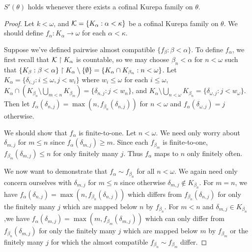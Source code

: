 \documentclass[11pt]{article}
\begin{document}
  \begin{theorem}
    \(S'(\theta)\) holds whenever there exists a cofinal Kurepa family on \(\theta\).
  \end{theorem}

  \begin{proof}
    Let \(k<\omega\), and \(\mathcal{K}=\{K_\alpha:\alpha<\kappa\}\)
    be a cofinal Kurepa family on \(\theta\).
    We should define \(f_\alpha:K_\alpha\to\omega\) for each \(\alpha<\kappa\).

    Suppose we've defined pairwise almost compatible
    \(\{f_\beta:\beta<\alpha\}\). To define
    \(f_\alpha\), we first recall that \(\mathcal{K}\restriction K_\alpha\) is countable,
    so we may choose \(\beta_n<\alpha\) for \(n<\omega\) such that
    \(
      \{K_\beta:\beta<\alpha\}\restriction K_\alpha \setminus \{\emptyset\}
        =
      \{K_\alpha\cap K_{\beta_n}:n<\omega\}
    \).
    Let \(K_\alpha=\{\delta_{i,j}:i\leq\omega,j<w_i\}\) where
    \(w_i\leq\omega\) for each \(i\leq\omega\),
    \(
      K_\alpha\cap \left(K_{\beta_n}\setminus\bigcup_{m<n}K_{\beta_m}\right)
        =
      \{\delta_{n,j}:j<w_n\}
    \),
    and
    \(
      K_\alpha\setminus\bigcup_{n<\omega}K_{\beta_n}
        =
      \{
        \delta_{\omega,j}:j<w_\omega
      \}
    \).
    Then let \(f_\alpha(\delta_{n,j})=\max(n,f_{\beta_n}(\delta_{n,j}))\) for
    \(n<\omega\) and \(f_\alpha(\delta_{\omega,j})=j\) otherwise.

    We should show that \(f_\alpha\) is finite-to-one. Let \(n<\omega\).
    We need only worry about \(\delta_{m,j}\) for \(m\leq n\) since
    \(f_\alpha(\delta_{m,j})\geq m\). Since each
    \(f_{\beta_m}\) is finite-to-one, \(f_{\beta_m}(\delta_{m,j})\leq n\)
    for only finitely many \(j\). Thus \(f_\alpha\) maps to
    \(n\) only finitely often.

    We now want to demonstrate that \(f_\alpha\sim f_{\beta_n}\) for all
    \(n<\omega\). We again need only concern ourselves with \(\delta_{m,j}\) for
    \(m\leq n\) since otherwise \(\delta_{m,j}\not\in K_{\beta_n}\).
    For \(m=n\), we have
    \(f_\alpha(\delta_{n,j})=\max(n,f_{\beta_n}(\delta_{n,j}))\) which differs
    from \(f_{\beta_n}(\delta_{n,j})\) for only the finitely many \(j\) which
    are mapped below \(n\) by \(f_{\beta_n}\).
    For \(m<n\) and \(\delta_{m,j}\in K_{\beta_n}\),we have
    \(f_\alpha(\delta_{m,j})=\max(m,f_{\beta_m}(\delta_{m,j}))\) which can
    only differ
    from \(f_{\beta_n}(\delta_{m,j})\) for only the finitely many \(j\) which
    are mapped below \(m\) by \(f_{\beta_m}\) or the finitely many \(j\)
    for which the
    almost compatible \(f_{\beta_n}\sim f_{\beta_m}\) differ.
  \end{proof}
\end{document}
